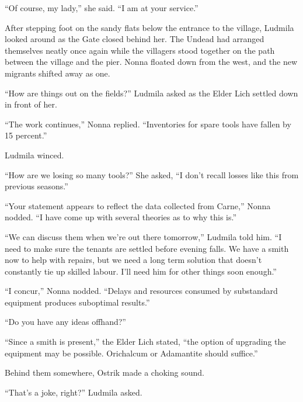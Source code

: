  

“Of course, my lady,” she said. “I am at your service.”

 

After stepping foot on the sandy flats below the entrance to the village, Ludmila looked around as the Gate closed behind her. The Undead had arranged themselves neatly once again while the villagers stood together on the path between the village and the pier. Nonna floated down from the west, and the new migrants shifted away as one.

 

“How are things out on the fields?” Ludmila asked as the Elder Lich settled down in front of her.

 

“The work continues,” Nonna replied. “Inventories for spare tools have fallen by 15 percent.”

 

Ludmila winced.

 

“How are we losing so many tools?” She asked, “I don’t recall losses like this from previous seasons.”

 

“Your statement appears to reflect the data collected from Carne,” Nonna nodded. “I have come up with several theories as to why this is.”

 

“We can discuss them when we’re out there tomorrow,” Ludmila told him. “I need to make sure the tenants are settled before evening falls. We have a smith now to help with repairs, but we need a long term solution that doesn’t constantly tie up skilled labour. I’ll need him for other things soon enough.”

 

“I concur,” Nonna nodded. “Delays and resources consumed by substandard equipment produces suboptimal results.”

 

“Do you have any ideas offhand?”

 

“Since a smith is present,” the Elder Lich stated, “the option of upgrading the equipment may be possible. Orichalcum or Adamantite should suffice.”

 

Behind them somewhere, Ostrik made a choking sound.

 

“That’s a joke, right?” Ludmila asked.

